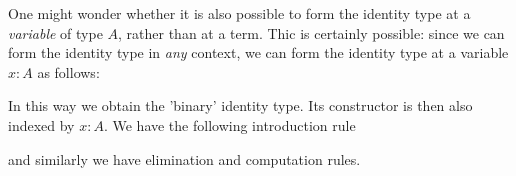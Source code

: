 \begin{rmk}
  One might wonder whether it is also possible to form the identity type at a \emph{variable} of type $A$, rather than at a term. Thic is certainly possible: since we can form the identity type in \emph{any} context, we can form the identity type at a variable $x:A$ as follows:
  \begin{prooftree}
  \end{prooftree}
  In this way we obtain the 'binary' identity type. Its constructor is then also indexed by $x:A$. We have the following introduction rule
  \begin{prooftree}
  \end{prooftree}
  and similarly we have elimination and computation rules.
\end{rmk}
 

\begin{comment}
In the following lemma we show that the identity type on $A$ is contained in any reflexive relation on $A$.

\begin{lem}
Let $\Gamma,x:A,y:A\vdash R(x,y)~\mathrm{type}$\index{reflexive relation|textit}\index{relation!reflexive}, and suppose that $R$ is reflexive in the sense that there is a term
\begin{equation*}
\rho:\prd{x:A}R(x,x)
\end{equation*}
Then there is a term of type
\begin{equation*}
\prd{y:A} (x=_A y)\to R(x,y)
\end{equation*}
in context $\Gamma,x:A$.
\end{lem}

\begin{constr}
By weakening the reflexive relation $R$ we obtain
\begin{equation*}
\Gamma,x:A,y:A,\alpha:x=_A y\vdash R(x,y)~\mathrm{type},
\end{equation*}
on which the induction principle is applicable.
Thus we see that by the induction principle for identity types we have a term
\begin{equation*}
\mathsf{path\usc{}ind}_x : R(x,x)\to \prd{y:A}(x=_A y)\to R(x,y)
\end{equation*}
so it suffices to construct a term of type $R(x,x)$, which we have by reflexivity of $R$.
\end{constr}
\end{comment}

